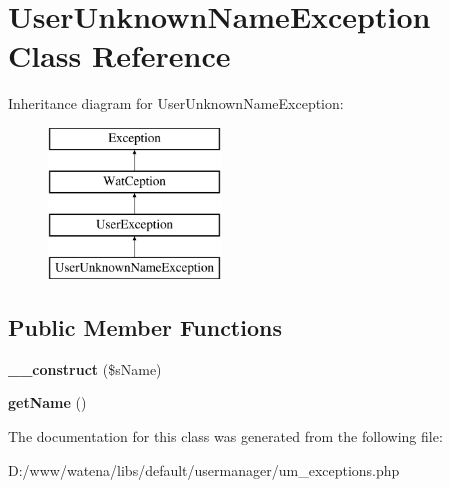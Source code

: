 \hypertarget{class_user_unknown_name_exception}{\section{User\-Unknown\-Name\-Exception Class Reference}
\label{class_user_unknown_name_exception}
}
Inheritance diagram for User\-Unknown\-Name\-Exception\-:\begin{figure}[H]
\begin{center}
\leavevmode
\includegraphics[height=4.000000cm]{class_user_unknown_name_exception}
\end{center}
\end{figure}
\subsection*{Public Member Functions}
\begin{DoxyCompactItemize}
\item 
\hypertarget{class_user_unknown_name_exception_a3f04b2183061dbeafbcfc5ebe5b88555}{{\bfseries \-\_\-\-\_\-construct} (\$s\-Name)}\label{class_user_unknown_name_exception_a3f04b2183061dbeafbcfc5ebe5b88555}

\item 
\hypertarget{class_user_unknown_name_exception_add29811430e2da907f8a81076b7f616e}{{\bfseries get\-Name} ()}\label{class_user_unknown_name_exception_add29811430e2da907f8a81076b7f616e}

\end{DoxyCompactItemize}


The documentation for this class was generated from the following file\-:\begin{DoxyCompactItemize}
\item 
D\-:/www/watena/libs/default/usermanager/um\-\_\-exceptions.\-php\end{DoxyCompactItemize}
